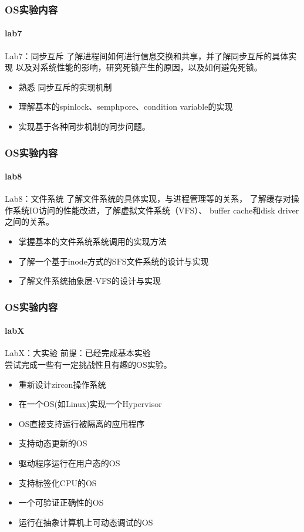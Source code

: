\documentclass[UTF8]{ctexbeamer}
\begin{document}
\begin{frame}
\frametitle{OS实验内容}
\framesubtitle{lab7}

\begin{block}{Lab7：同步互斥}
了解进程间如何进行信息交换和共享，并了解同步互斥的具体实现
以及对系统性能的影响，研究死锁产生的原因，以及如何避免死锁。
\end{block}

\begin{itemize}
    \item 熟悉 同步互斥的实现机制
    \item 理解基本的spinlock、semphpore、condition variable的实现
    \item 实现基于各种同步机制的同步问题。
\end{itemize}

\end{frame}


\begin{frame}
\frametitle{OS实验内容}
\framesubtitle{lab8}

\begin{block}{Lab8：文件系统}
了解文件系统的具体实现，与进程管理等的关系，
了解缓存对操作系统IO访问的性能改进，了解虚拟文件系统（VFS）、
buffer cache和disk driver之间的关系。
\end{block}

\begin{itemize}
    \item 掌握基本的文件系统系统调用的实现方法
    \item 了解一个基于inode方式的SFS文件系统的设计与实现
    \item 了解文件系统抽象层-VFS的设计与实现
\end{itemize}

\end{frame}


\begin{frame}
\frametitle{OS实验内容}
\framesubtitle{labX}

\begin{block}{LabX：大实验}
前提：已经完成基本实验 \\
尝试完成一些有一定挑战性且有趣的OS实验。
\end{block}

\begin{itemize}
    \item 重新设计zircon操作系统
    \item 在一个OS(如Linux)实现一个Hypervisor
    \item OS直接支持运行被隔离的应用程序
    \item 支持动态更新的OS
    \item 驱动程序运行在用户态的OS
    \item 支持标签化CPU的OS
    \item 一个可验证正确性的OS
    \item 运行在抽象计算机上可动态调试的OS
\end{itemize}

\end{frame}
\end{document}
